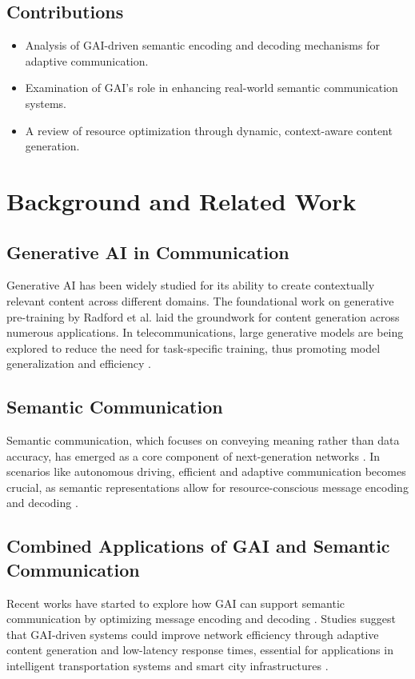 \documentclass[journal]{IEEEtran}
\begin{document}
\subsection{Contributions}
\begin{itemize}
    \item Analysis of GAI-driven semantic encoding and decoding mechanisms for adaptive communication.
    \item Examination of GAI’s role in enhancing real-world semantic communication systems.
    \item A review of resource optimization through dynamic, context-aware content generation.
\end{itemize}

\section{Background and Related Work}

\subsection{Generative AI in Communication}
Generative AI has been widely studied for its ability to create contextually relevant content across different domains. The foundational work on generative pre-training by Radford et al. \cite{Radford2018ImprovingLU} laid the groundwork for content generation across numerous applications. In telecommunications, large generative models are being explored to reduce the need for task-specific training, thus promoting model generalization and efficiency \cite{bariah2023largegenerativeaimodels,10614204}.

\subsection{Semantic Communication}
Semantic communication, which focuses on conveying meaning rather than data accuracy, has emerged as a core component of next-generation networks \cite{9955312}. In scenarios like autonomous driving, efficient and adaptive communication becomes crucial, as semantic representations allow for resource-conscious message encoding and decoding \cite{10319661,raha2023generativeaidrivensemanticcommunication}.

\subsection{Combined Applications of GAI and Semantic Communication}
Recent works have started to explore how GAI can support semantic communication by optimizing message encoding and decoding \cite{10447237}. Studies suggest that GAI-driven systems could improve network efficiency through adaptive content generation and low-latency response times, essential for applications in intelligent transportation systems and smart city infrastructures \cite{jiang2024largeaimodelbasedsemantic}.
\end{document}
